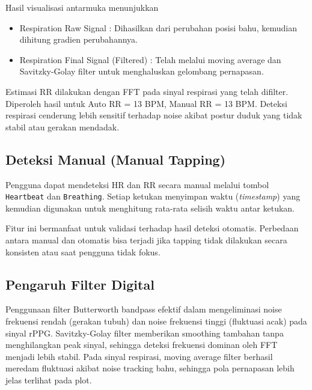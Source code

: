 \documentclass[11pt,a4paper]{article}
\begin{document}
Hasil visualisasi antarmuka menunjukkan
\begin{itemize}
    \item Respiration Raw Signal : Dihasilkan dari perubahan posisi bahu, kemudian dihitung gradien perubahannya.
    \item Respiration Final Signal (Filtered) : Telah melalui moving average dan Savitzky-Golay filter untuk menghaluskan gelombang pernapasan.
    \end{itemize}

    Estimasi RR dilakukan dengan FFT pada sinyal respirasi yang telah difilter. Diperoleh hasil untuk Auto RR = 13 BPM, Manual RR = 13 BPM. Deteksi respirasi cenderung lebih sensitif terhadap noise akibat postur duduk yang tidak stabil atau gerakan mendadak.

\subsection{Deteksi Manual (Manual Tapping)}
    Pengguna dapat mendeteksi HR dan RR secara manual melalui tombol \texttt{Heartbeat} dan \texttt{Breathing}. Setiap ketukan menyimpan waktu (\textit{timestamp}) yang kemudian digunakan untuk menghitung rata-rata selisih waktu antar ketukan.

    Fitur ini bermanfaat untuk validasi terhadap hasil deteksi otomatis. Perbedaan antara manual dan otomatis bisa terjadi jika tapping tidak dilakukan secara konsisten atau saat pengguna tidak fokus.

\subsection{Pengaruh Filter Digital}
    Penggunaan filter Butterworth bandpass efektif dalam mengeliminasi noise frekuensi rendah (gerakan tubuh) dan noise frekuensi tinggi (fluktuasi acak) pada sinyal rPPG. Savitzky-Golay filter memberikan smoothing tambahan tanpa menghilangkan peak sinyal, sehingga deteksi frekuensi dominan oleh FFT menjadi lebih stabil. Pada sinyal respirasi, moving average filter berhasil meredam fluktuasi akibat noise tracking bahu, sehingga pola pernapasan lebih jelas terlihat pada plot.
\end{document}
